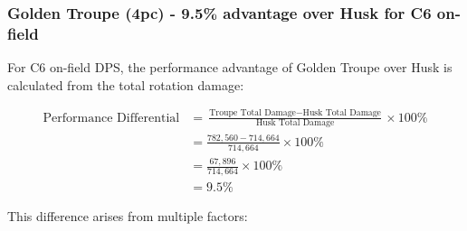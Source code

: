 \documentclass[12pt,a4paper]{article}
\begin{document}
\subsubsection{Golden Troupe (4pc) - 9.5\% advantage over Husk for C6 on-field}

For C6 on-field DPS, the performance advantage of Golden Troupe over Husk is calculated from the total rotation damage:

\begin{align}
\text{Performance Differential} &= \frac{\text{Troupe Total Damage} - \text{Husk Total Damage}}{\text{Husk Total Damage}} \times 100\% \\
&= \frac{782,560 - 714,664}{714,664} \times 100\% \\
&= \frac{67,896}{714,664} \times 100\% \\
&= 9.5\%
\end{align}

This difference arises from multiple factors:
\end{document}
